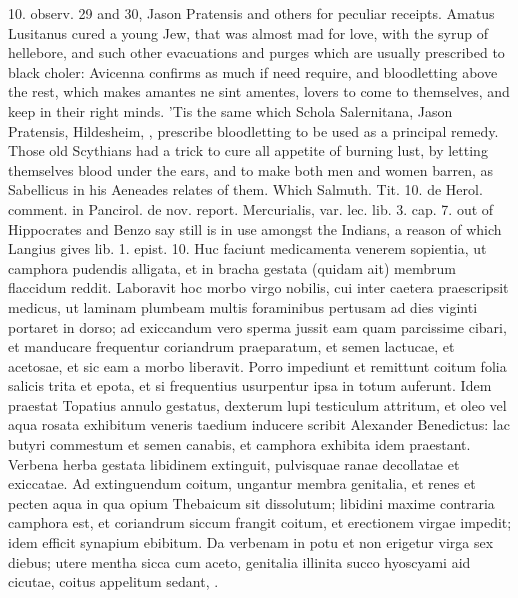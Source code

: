 {10. observ. 29 and 30, Jason Pratensis and others for peculiar
receipts. Amatus Lusitanus cured a young Jew, that was almost mad
for love, with the syrup of hellebore, and such other evacuations and
purges which are usually prescribed to black choler: Avicenna
confirms as much if need require, and bloodletting above the
rest, which makes amantes ne sint amentes, lovers to come to
themselves, and keep in their right minds. 'Tis the same which Schola
Salernitana, Jason Pratensis, Hildesheim, \etc{}, prescribe bloodletting
to be used as a principal remedy. Those old Scythians had a trick to
cure all appetite of burning lust, by  letting themselves blood
under the ears, and to make both men and women barren, as Sabellicus in
his Aeneades relates of them. Which Salmuth. Tit. 10. de Herol.
comment. in Pancirol. de nov. report. Mercurialis, var. lec. lib. 3.
cap. 7. out of Hippocrates and Benzo say still is in use amongst the
Indians, a reason of which Langius gives lib. 1. epist. 10.
Huc faciunt medicamenta venerem sopientia, ut camphora pudendis
alligata, et in bracha gestata (quidam ait) membrum flaccidum reddit.
Laboravit hoc morbo virgo nobilis, cui inter caetera praescripsit
medicus, ut laminam plumbeam multis foraminibus pertusam ad dies
viginti portaret in dorso; ad exiccandum vero sperma jussit eam quam
parcissime cibari, et manducare frequentur coriandrum praeparatum, et
semen lactucae, et acetosae, et sic eam a morbo liberavit. Porro
impediunt et remittunt coitum folia salicis trita et epota, et si
frequentius usurpentur ipsa in totum auferunt. Idem praestat Topatius
annulo gestatus, dexterum lupi testiculum attritum, et oleo vel aqua
rosata exhibitum veneris taedium inducere scribit Alexander Benedictus:
lac butyri commestum et semen canabis, et camphora exhibita idem
praestant. Verbena herba gestata libidinem extinguit, pulvisquae ranae
decollatae et exiccatae. Ad extinguendum coitum, ungantur membra
genitalia, et renes et pecten aqua in qua opium Thebaicum sit
dissolutum; libidini maxime contraria camphora est, et coriandrum
siccum frangit coitum, et erectionem virgae impedit; idem efficit
synapium ebibitum. Da verbenam in potu et non erigetur virga sex
diebus; utere mentha sicca cum aceto, genitalia illinita succo
hyoscyami aid cicutae, coitus appelitum sedant, \etc{}.


}
